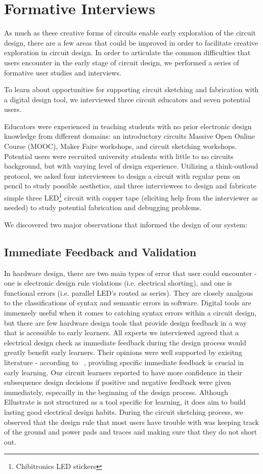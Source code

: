 \documentclass{sigchi}
\begin{document}
\section{Formative Interviews}
As much as these creative forms of circuits enable early exploration of the circuit design, there are a few areas that could be improved in order to facilitate creative exploration in circuit design. In order to articulate the common difficulties that users encounter in the early stage of circuit design, we performed a series of formative user studies and interviews. 

To learn about opportunities for supporting circuit sketching and fabrication with a digital design tool, we interviewed three circuit educators and seven potential users. 

Educators were experienced in teaching students with no prior electronic design knowledge from different domains: an introductory circuits Massive Open Online Course (MOOC), Maker Faire workshops, and circuit sketching workshops. 
Potential users were recruited university students with little to no circuits background, but with varying level of design experience. Utilizing a think-outloud protocol, we asked four interviewees to design a circuit with regular pens on pencil to study possible aesthetics, and three interviewees to design and fabricate simple three LED\footnote{Chibitronics LED stickers} circuit with copper tape (eliciting help from the interviewer as needed) to study potential fabrication and debugging problems.

We discovered two major observations that informed the design of our system:

\subsection{Immediate Feedback and Validation}
In hardware design, there are two main types of error that user could encounter - one is electronic design rule violations (i.e. electrical shorting), and one is functional errors (i.e. parallel LED's routed as series). They are closely analgous to the classifications of syntax and semantic errors in software. Digital tools are immensely useful when it comes to catching syntax errors within a circuit design, but there are few hardware design tools that provide design feedback in a way that is accessible to early learners. All experts we interviewed agreed that a electrical design check as immediate feedback during the design process would greatly benefit early learners. Their opinions were well supported by exisitng literature - according to ~\cite{Hattie:2007gi,Epstein:2002ur}, providing specific immediate feedback is crucial in early learning. Our circuit learners reported to have more confidence in their subsequence design decisions if positive and negative feedback were given immediately, especailly in the beginning of the design process. Although Ellustrate is not structured as a tool specific for learning, it does aim to build lasting good electrical design habits. During the circuit sketching process, we observed that the design rule that most users have trouble with was keeping track of the ground and power pads and traces and making sure that they do not short out. 
\end{document}
